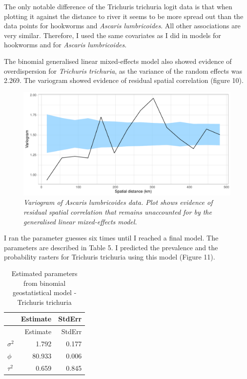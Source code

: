 \documentclass[
]{article}
\begin{document}
The only notable difference of the Trichuris trichuria logit data is
that when plotting it against the distance to river it seems to be more
spread out than the data points for hookworms and \emph{Ascaris
lumbricoides}. All other associations are very similar. Therefore, I
used the same covariates as I did in models for hookworms and for
\emph{Ascaris lumbricoides}.

The binomial generalised linear mixed-effects model also showed evidence
of overdispersion for \emph{Trichuris trichuria}, as the variance of the
random effects was 2.269. The variogram showed evidence of residual
spatial correlation (figure 10).

\begin{figure}
\centering
\includegraphics{write_up_files/figure-latex/TT.variogram_2-1.pdf}
\caption{\textit{Variogram of Ascaris lumbricoides data. Plot shows evidence of residual spatial correlation that remains unaccounted for by the generalised linear mixed-effects model.}}
\end{figure}

I ran the parameter guesses six times until I reached a final model. The
parameters are described in Table 5. I predicted the prevalence and the
probability rasters for Trichuris trichuria using this model (Figure
11).

\begin{longtable}[]{@{}lrr@{}}
\caption{Estimated parameters from binomial geostatistical model -
Trichuris trichuria}\tabularnewline
\toprule
& Estimate & StdErr \\
\midrule
\endfirsthead
\toprule
& Estimate & StdErr \\
\midrule
\endhead
\(\sigma^2\) & 1.792 & 0.177 \\
\(\phi\) & 80.933 & 0.006 \\
\(\tau^2\) & 0.659 & 0.845 \\
\bottomrule
\end{longtable}
\end{document}
